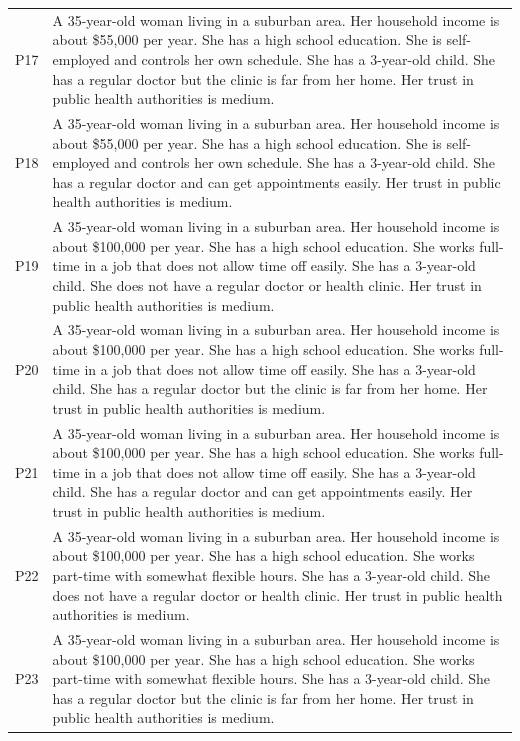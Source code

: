 \begin{longtable}{p{1.2cm}p{12cm}}
P17 & A 35-year-old woman living in a suburban area. Her household income is about \$55,000 per year. She has a high school education. She is self-employed and controls her own schedule. She has a 3-year-old child. She has a regular doctor but the clinic is far from her home. Her trust in public health authorities is medium. \\
P18 & A 35-year-old woman living in a suburban area. Her household income is about \$55,000 per year. She has a high school education. She is self-employed and controls her own schedule. She has a 3-year-old child. She has a regular doctor and can get appointments easily. Her trust in public health authorities is medium. \\
P19 & A 35-year-old woman living in a suburban area. Her household income is about \$100,000 per year. She has a high school education. She works full-time in a job that does not allow time off easily. She has a 3-year-old child. She does not have a regular doctor or health clinic. Her trust in public health authorities is medium. \\
P20 & A 35-year-old woman living in a suburban area. Her household income is about \$100,000 per year. She has a high school education. She works full-time in a job that does not allow time off easily. She has a 3-year-old child. She has a regular doctor but the clinic is far from her home. Her trust in public health authorities is medium. \\
P21 & A 35-year-old woman living in a suburban area. Her household income is about \$100,000 per year. She has a high school education. She works full-time in a job that does not allow time off easily. She has a 3-year-old child. She has a regular doctor and can get appointments easily. Her trust in public health authorities is medium. \\
P22 & A 35-year-old woman living in a suburban area. Her household income is about \$100,000 per year. She has a high school education. She works part-time with somewhat flexible hours. She has a 3-year-old child. She does not have a regular doctor or health clinic. Her trust in public health authorities is medium. \\
P23 & A 35-year-old woman living in a suburban area. Her household income is about \$100,000 per year. She has a high school education. She works part-time with somewhat flexible hours. She has a 3-year-old child. She has a regular doctor but the clinic is far from her home. Her trust in public health authorities is medium. \\

\end{longtable}
